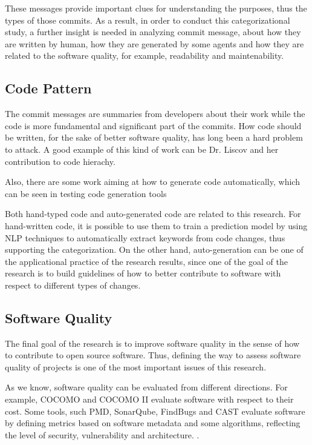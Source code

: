 These messages provide important clues for understanding the purposes, thus the types of those commits. 
As a result, in order to conduct this categorizational study, a further insight is needed in analyzing commit message, about how they are written by human, how they are generated by some agents and how they are related to the software quality, for example, readability and maintenability.


\subsection{Code Pattern}
The commit messages are summaries from developers about their work while the code is more fundamental and significant part of the commits. 
How code should be written, for the sake of better software quality, has long been a hard problem to attack.
A good example of this kind of work can be Dr. Liscov and her contribution to code hierachy.

Also, there are some work aiming at how to generate code automatically, which can be seen in testing code generation tools 

Both hand-typed code and auto-generated code are related to this research.
For hand-written code, it is possible to use them to train a prediction model by using NLP techniques to automatically extract keywords from code changes, thus supporting the categorization.
On the other hand, auto-generation can be one of the applicational practice of the research results, since one of the goal of the research is to build guidelines of how to better contribute to software with respect to different types of changes.


\subsection{Software Quality}
The final goal of the research is to improve software quality in the sense of how to contribute to open source software. 
Thus, defining the way to assess software quality of projects is one of the most important issues of this research.

As we know, software quality can be evaluated from different directions. 
For example, COCOMO and COCOMO II  evaluate software with respect to their cost.
Some tools, such PMD, SonarQube, FindBugs and CAST evaluate software by defining metrics based on software metadata and some algorithms, reflecting the level of security, vulnerability and architecture. .

